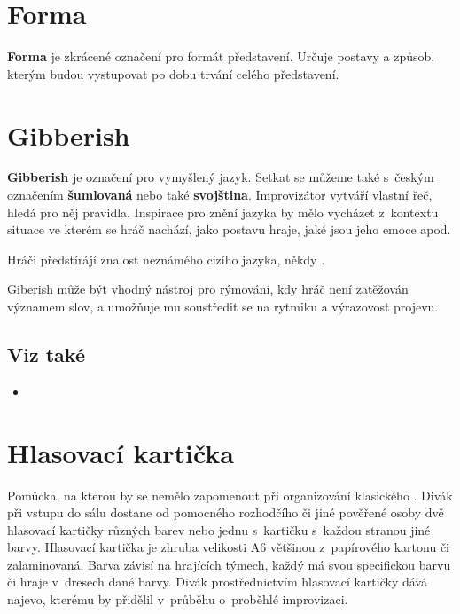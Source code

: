  
 
 
\needspace{5cm} \section{Forma} \label{forma} \textbf{Forma} je zkrácené označení pro formát představení. Určuje postavy a způsob, kterým budou vystupovat po dobu trvání celého představení.  
 
 
\needspace{5cm} \section{Gibberish} \label{gibberish} \textbf{Gibberish} je označení pro vymyšlený jazyk. Setkat se můžeme také s~českým označením \textbf{šumlovaná} nebo také \textbf{svojština}. Improvizátor vytváří vlastní řeč, hledá pro něj pravidla. Inspirace pro znění jazyka by mělo vycházet z~kontextu situace ve kterém se hráč nachází, jako postavu hraje, jaké jsou jeho emoce apod. 
 
Hráči předstírájí  znalost neznámého cizího jazyka, někdy . 
 
Giberish může být vhodný nástroj pro rýmování, kdy hráč není zatěžován významem slov, a umožňuje mu soustředit se na rytmiku a výrazovost projevu. 
 
\subsection{Viz také} \begin{itemize}
\item {}
\end{itemize}
 
 
\needspace{5cm} \section{Hlasovací kartička} \label{hlasovací kartička}  
 
Pomůcka, na kterou by se nemělo zapomenout při organizování klasického . Divák při vstupu do sálu dostane od pomocného rozhodčího či jiné pověřené osoby dvě hlasovací kartičky různých barev nebo jednu s~kartičku s~každou stranou jiné barvy. Hlasovací kartička je zhruba velikosti A6 většinou z~papírového kartonu či zalaminovaná. Barva závisí na hrajících týmech, každý  má svou specifickou barvu či hraje v~dresech dané barvy. Divák prostřednictvím hlasovací kartičky dává najevo, kterému  by přidělil  v~průběhu  o~proběhlé improvizaci. 
 
